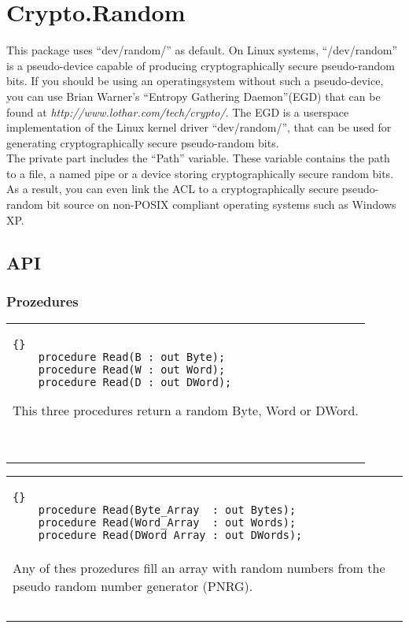 \chapter{Crypto.Random}
This package uses ``dev/random/'' as default.
On Linux systems, ``/dev/random'' is a pseudo-device capable of producing
cryptographically secure pseudo-random bits. If you should be using an 
operatingsystem without such a pseudo-device, you can use Brian Warner's
``Entropy Gathering Daemon''(EGD) that can be found at
\textit{http://www.lothar.com/tech/crypto/}.
The EGD is a userspace implementation of the Linux kernel driver
 ``dev/random/'', that can be used for generating cryptographically secure 
pseudo-random bits.\\
The private part includes the ``Path'' variable. These variable contains the
path to a file, a named pipe or a device storing cryptographically secure 
random bits. As a result, you can even link the ACL to a cryptographically 
secure pseudo-random bit source on non-POSIX compliant operating systems such 
as Windows XP.

\section{API}
\subsection{Prozedures}
\begin{tabular}{p{\textwidth}}
  \begin{lstlisting}{}
    procedure Read(B : out Byte);
    procedure Read(W : out Word);
    procedure Read(D : out DWord);
  \end{lstlisting}
This three procedures return a random Byte, Word or DWord. \\ \ \\
  \hline\\
\end{tabular}

\begin{tabular}{p{\textwidth}}
  \begin{lstlisting}{}
    procedure Read(Byte_Array  : out Bytes);
    procedure Read(Word_Array  : out Words);
    procedure Read(DWord_Array : out DWords);
  \end{lstlisting}\\
Any of thes  prozedures fill an array with random numbers from the pseudo 
random number generator (PNRG).\\ \ \\
\end{tabular}


